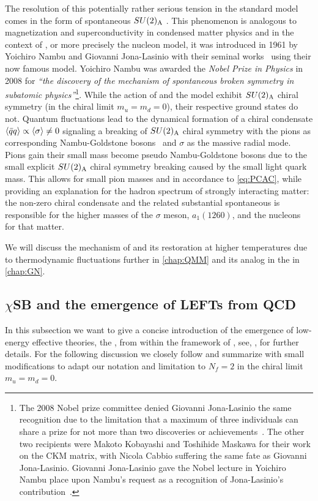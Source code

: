 The resolution of this potentially rather serious tension in the standard model comes in the form of spontaneous $SU(2)_{\mathrm{A}}$ .
This phenomenon is analogous to magnetization and superconductivity in condensed matter physics and in the context of \qcd{}, or more precisely the nucleon model, it was introduced in 1961 by Yoichiro Nambu and Giovanni Jona-Lasinio with their seminal works~\cite{Nambu:1961tp,Nambu:1961fr} using their now famous  model. Yoichiro Nambu was awarded the \textit{Nobel Prize in Physics} in 2008 for \textit{``the discovery of the mechanism of spontaneous broken symmetry in subatomic physics''}\footnote{%
	The 2008 Nobel prize committee denied Giovanni Jona-Lasinio the same recognition due to the limitation that a maximum of three individuals can share a prize for not more than two discoveries or achievements~\cite{Jamieson2008Oct}.
	The other two recipients were  Makoto Kobayashi and Toshihide Maskawa for their work on the CKM matrix, with Nicola Cabbio suffering the same fate as Giovanni Jona-Lasinio.
	Giovanni Jona-Lasinio gave the Nobel lecture in Yoichiro Nambu place upon Nambu's request as a recognition of Jona-Lasinio's contribution~\cite{NJLnobel}.
}.
While the action of \qcd{} and the \njl{} model exhibit $SU(2)_{\mathrm{A}}$ chiral symmetry (in the chiral limit $m_u=m_d=0$), their respective ground states do not.
Quantum fluctuations lead to the dynamical formation of a chiral condensate $\langle \bar{q} q \rangle\propto\langle \sigma \rangle\neq 0$ signaling a breaking of $SU(2)_{\mathrm{A}}$ chiral symmetry with the pions as corresponding Nambu-Goldstone bosons~\cite{Nambu:1960tm,Goldstone:1961eq} and $\sigma$ as the massive radial mode. 
Pions gain their small mass \dash{} become pseudo Nambu-Goldstone bosons \dash{} due to the small explicit $SU(2)_{\mathrm{A}}$ chiral symmetry breaking caused by the small light quark mass.
This allows for small pion masses and \pcac{} in accordance to \cref{eq:PCAC}, while providing an explanation for the hadron spectrum of strongly interacting matter: the non-zero chiral condensate and the related substantial spontaneous \csb{} is responsible for the higher masses of the $\sigma$ meson, $a_1(1260)$, and the nucleons for that matter.

We will discuss the mechanism of \csb{} and its restoration at higher temperatures due to thermodynamic fluctuations further in \cref{chap:QMM} and its analog in the \twoDimensional{} \gnm{} in \cref{chap:GN}.

\subsection{\texorpdfstring{$\chi$SB}{cSB} and the emergence of LEFTs from QCD}\label{subsec:chiralLEFT}
In this subsection we want to give a concise introduction of the emergence of low-energy effective theories, \viz{} the \qmm{}, from \qcd{} within the framework of \frg{}, see, \eg{},  for further details.
For the following discussion we closely follow and summarize  with small modifications to adapt our notation and limitation to $N_f=2$ in the chiral limit $m_u=m_d=0$.\bigskip

